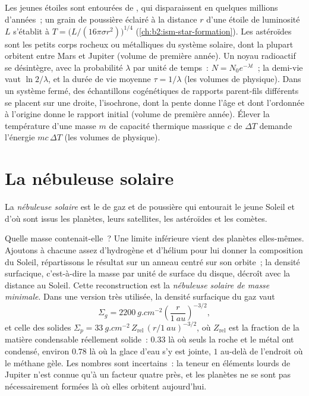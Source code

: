 \begin{recall}
Les jeunes étoiles sont entourées de , qui disparaissent en quelques
millions d'années~; un grain de poussière éclairé à la distance $r$ d'une étoile de luminosité
$L$ s'établit à $T = \bigl(L/(16\pi\sigma r^2)\bigr)^{1/4}$ (\cref{ch:b2:ism-star-formation}).
Les astéroïdes sont les petits corps rocheux ou métalliques du système solaire, dont la
plupart orbitent entre Mars et Jupiter (volume de première année). Un noyau radioactif se
désintègre, avec la probabilité $\lambda$ par unité de temps~: $N = N_0 e^{-\lambda t}$~; la
demi-vie vaut $\ln 2/\lambda$, et la durée de vie moyenne $\tau = 1/\lambda$ (les volumes de
physique). Dans un système fermé, des échantillons cogénétiques de rapports parent-fils
différents se placent sur une droite, l'isochrone, dont la pente donne l'âge et dont
l'ordonnée à l'origine donne le rapport initial (volume de première année). Élever la
température d'une masse $m$ de capacité thermique massique $c$ de $\Delta T$ demande l'énergie
$mc\,\Delta T$ (les volumes de physique).
\end{recall}

\section{La nébuleuse solaire}

\begin{definition}\label{def:b2:planet-formation-meteorites:nebula}
La \emph{nébuleuse solaire} est le  de gaz et
de poussière qui entourait le jeune Soleil et d'où sont issus les planètes, leurs
satellites, les astéroïdes et les comètes.
\end{definition}

Quelle masse contenait-elle~? Une limite inférieure vient des planètes elles-mêmes.
Ajoutons à chacune assez d'hydrogène et d'hélium pour lui donner la composition du
Soleil, répartissons le résultat sur un anneau centré sur son orbite~; la densité
surfacique, c'est-à-dire la masse par unité de surface du disque, décroît avec la
distance au Soleil. Cette reconstruction est la \emph{nébuleuse solaire de masse
minimale}. Dans une version très utilisée, la
densité surfacique du gaz vaut
\[
  \Sigma_g = \qty{2200}{g.cm^{-2}}\left(\frac{r}{\qty{1}{au}}\right)^{-3/2},
\]
et celle des solides $\Sigma_p = \qty{33}{g.cm^{-2}}\,Z_{\mathrm{rel}}\,
(r/\qty{1}{au})^{-3/2}$, où $Z_{\mathrm{rel}}$ est la fraction de la matière
condensable réellement solide~: $0.33$ là où seuls la roche et le métal ont condensé,
environ $0.78$ là où la glace d'eau s'y est jointe, $1$ au-delà de l'endroit où le méthane gèle.
Les nombres sont incertains~: la teneur en éléments lourds de Jupiter n'est connue
qu'à un facteur quatre près, et les planètes ne se sont pas nécessairement formées
là où elles orbitent aujourd'hui.

